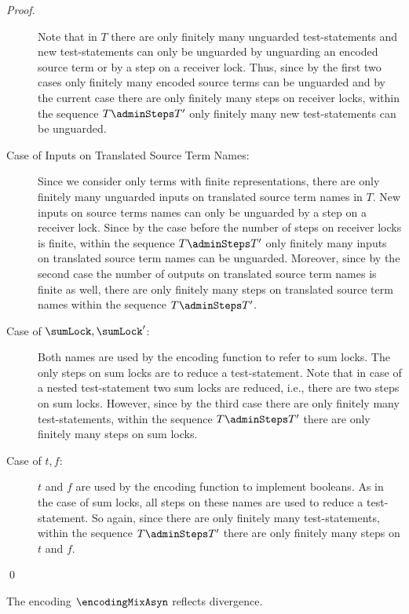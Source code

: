 \documentclass[]{llncs}
\begin{document}
\begin{proof}
\begin{description}
			Note that in $ T $ there are only finitely many unguarded test-statements and new test-statements can only be unguarded by unguarding an encoded source term or by a step on a receiver lock. Thus, since by the first two cases only finitely many encoded source terms can be unguarded and by the current case there are only finitely many steps on receiver locks, within the sequence $ T \adminSteps T' $ only finitely many new test-statements can be unguarded.
		\item[Case of Inputs on Translated Source Term Names:] Since we consider only terms with finite representations, there are only finitely many unguarded inputs on translated source term names in $ T $. New inputs on source terms names can only be unguarded by a step on a receiver lock. Since by the case before the number of steps on receiver locks is finite, within the sequence $ T \adminSteps T' $ only finitely many inputs on translated source term names can be unguarded. Moreover, since by the second case the number of outputs on translated source term names is finite as well, there are only finitely many steps on translated source term names within the sequence $ T \adminSteps T' $.
		\item[Case of $ \sumLock, \sumLock' $:] Both names are used by the encoding function to refer to sum locks. The only steps on sum locks are to reduce a test-statement. Note that in case of a nested test-statement two sum locks are reduced, i.e., there are two steps on sum locks. However, since by the third case there are only finitely many test-statements, within the sequence $ T \adminSteps T' $ there are only finitely many steps on sum locks.
		\item[Case of $ t, f $:] $ t $ and $ f $ are used by the encoding function to implement booleans. As in the case of sum locks, all steps on these names are used to reduce a test-statement. So again, since there are only finitely many test-statements, within the sequence $ T \adminSteps T' $ there are only finitely many steps on $ t $ and $ f $.
	\end{description}
	\qed
\end{proof}

\begin{lemma} \label{lem:divergenceReflectionMixAsyn}
	The encoding $ \encodingMixAsyn $ reflects divergence.
\end{lemma}
\end{document}
